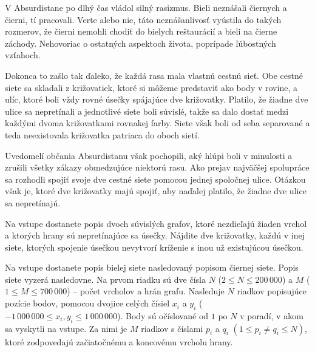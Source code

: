 





V Absurdistane po dlhý čas vládol silný rasizmus. Bieli neznášali čiernych a čierni, tí pracovali.
Verte alebo nie, táto neznášanlivosť vyústila do takých rozmerov, že čierni nemohli chodiť do
bielych reštaurácií a bieli na čierne záchody. Nehovoriac o ostatných aspektoch života, poprípade
ľúbostných vzťahoch.

Dokonca to zašlo tak ďaleko, že každá rasa mala vlastnú cestnú sieť. Obe cestné siete sa skladali z
križovatiek, ktoré si môžeme predstaviť ako body v rovine, a ulíc, ktoré boli vždy rovné úsečky
spájajúce dve križovatky. Platilo, že žiadne dve ulice sa nepretínali a jednotlivé siete boli súvislé,
takže sa dalo dostať medzi každými dvoma križovatkami rovnakej farby. Siete však boli od seba
separované a teda neexistovala križovatka patriaca do oboch sietí.

Uvedomelí občania Absurdistanu však pochopili, aký hlúpi boli v minulosti a zrušili všetky zákazy
obmedzujúce niektorú rasu. Ako prejav najväčšej spolupráce sa rozhodli spojiť svoje dve cestné siete
pomocou jednej spoločnej ulice. Otázkou však je, ktoré dve križovatky majú spojiť, aby naďalej
platilo, že žiadne dve ulice sa nepretínajú.


Na vstupe dostanete popis dvoch súvislých grafov, ktoré nezdieľajú žiaden vrchol a ktorých hrany sú
nepretínajúce sa úsečky. Nájdite dve križovatky, každú v inej siete, ktorých spojenie úsečkou nevytvorí
kríženie s inou už existujúcou úsečkou.


Na vstupe dostanete popis bielej siete nasledovaný popisom čiernej siete. Popis siete vyzerá
nasledovne. Na prvom riadku sú dve čísla $N$ ($2 \leq N \leq 200\,000$) a $M$ ($1 \leq M \leq
700\,000$) -- počet vrcholov a hrán grafu. Nasleduje $N$ riadkov popisujúce pozície bodov, pomocou
dvojice celých čísiel $x_i$ a $y_i$ ($-1\,000\,000 \leq x_i,y_i \leq 1\,000\,000$). Body sú
očíslované od $1$ po $N$ v poradí, v akom sa vyskytli na vstupe. Za nimi je $M$
riadkov s číslami $p_i$ a $q_i$ $(1 \leq p_i \neq q_i \leq N)$, ktoré zodpovedajú začiatočnému a
koncovému vrcholu hrany.

